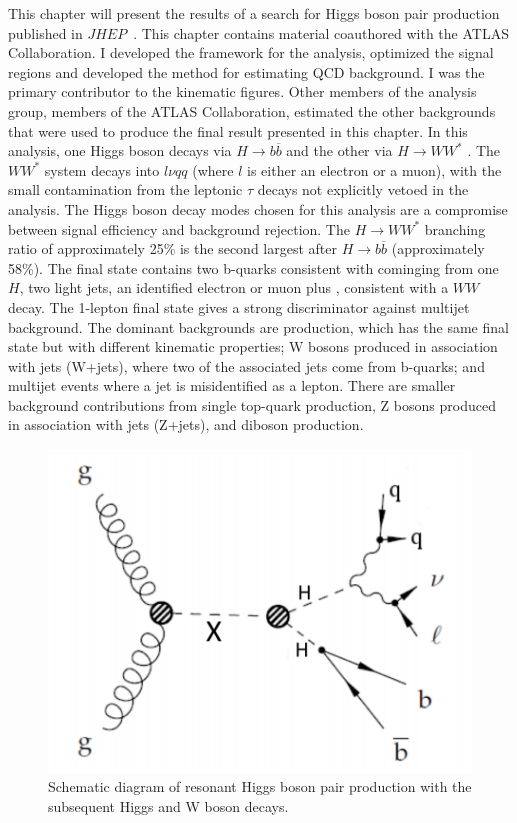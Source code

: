 This chapter will present the results of a search for Higgs boson pair production published in $JHEP$~\cite{Aaboud:2018zhh}. This chapter contains material coauthored with the ATLAS Collaboration. I developed the framework for the analysis, optimized the signal regions and developed the method for estimating QCD background. I was the primary contributor to the kinematic figures. Other members of the analysis group, members of the ATLAS Collaboration, estimated the other backgrounds that were used to produce the final result presented in this chapter. In this analysis, one Higgs boson decays via ${H\rightarrow b\overline{b}}$ and the other via ${H\rightarrow WW^{*}}$ . The ${WW^{*}}$ system decays into ${l\nu qq}$ (where ${l}$ is either an electron or a muon), with the small contamination from the leptonic ${\tau}$ decays not explicitly vetoed in the analysis. The Higgs boson decay modes chosen for this analysis are a compromise between signal efficiency and background rejection. The ${H\rightarrow WW^{*}}$ branching ratio of approximately 25\% is the second largest after ${H\rightarrow b\overline{b}}$ (approximately 58\%). The final state contains two b-quarks consistent with cominging from one $H$, two light jets, an identified electron or muon plus \met{}, consistent with a $WW$ decay. The 1-lepton final state gives a strong discriminator against multijet background. The dominant backgrounds are \ttbar{} production, which has the same final state but with different kinematic properties; W bosons produced in association with jets (W+jets), where two of the associated jets come from b-quarks; and multijet events where a jet is misidentified as a lepton. There are smaller background contributions from single top-quark production, Z bosons produced in association with jets (Z+jets), and diboson production.\newline

\begin{figure}[h]
\begin{center}
\includegraphics[scale=0.65]{figures/res_prod}
\caption[Schematic diagram of ${HH\rightarrow b\bar{b}WW^{*}\rightarrow b\bar{b}l\nu qq}$]{Schematic diagram of resonant Higgs boson pair production with the subsequent Higgs and W boson
decays.}
\label{fig:res}
\end{center}
\end{figure}

